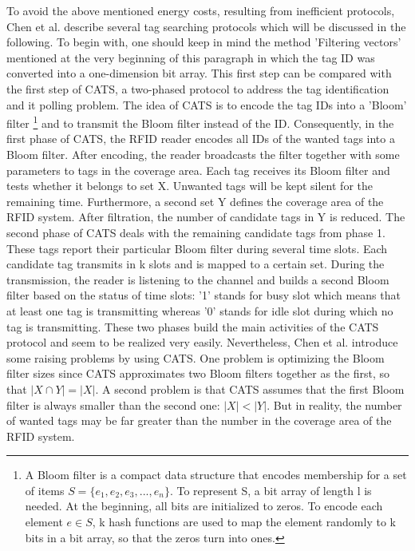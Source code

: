 To avoid the above mentioned energy costs, resulting from inefficient protocols, Chen et al. describe several tag searching protocols \cite[p.13 ff.]{chen} which will be discussed in the following. 
To begin with, one should keep in mind the method 'Filtering vectors' mentioned at the very beginning of this paragraph in which the tag ID was converted into a one-dimension bit array. This first step can be compared with the first step of \ac{CATS}, a two-phased protocol to address the tag identification and it polling problem. The idea of CATS is to encode the tag IDs into a 'Bloom' filter \footnote{A Bloom filter is a compact data structure that encodes membership for a set of items $S=\{ e_{1},e_{2},e_{3},...,e_{n}\}$. To represent S, a bit array of length l is needed. At the beginning, all bits are initialized to zeros. To encode each element $e \in S$, k hash functions are used to map the element randomly to k bits in a bit array, so that the zeros turn into ones.}  \cite[p.15]{chen} and to transmit the Bloom filter instead of the ID. 
Consequently, in the first phase of CATS, the RFID reader encodes all IDs of the wanted tags into a Bloom filter. After encoding, the reader broadcasts the filter together with some parameters to tags in the coverage area. Each tag receives its Bloom filter and tests whether it belongs to  set X. Unwanted tags will be kept silent for the remaining time. Furthermore, a second set Y defines the coverage area of the RFID system. After filtration, the number of candidate tags in Y is reduced.
The second phase of CATS deals with the remaining candidate tags from phase 1. These tags report their particular Bloom filter during several time slots. Each candidate tag transmits in k slots and is mapped to a certain set. During the transmission, the reader is listening to the channel and builds a second Bloom filter based on the status of time slots: '1' stands for busy slot which means that at least one tag is transmitting whereas '0' stands for idle slot during which no tag is transmitting. 
These two phases build the main activities of the CATS protocol and seem to be realized very easily. Nevertheless, Chen et al. introduce some raising problems by using CATS. One problem is optimizing the Bloom filter sizes since CATS approximates two Bloom filters together as the first, so that $|X \cap Y|=|X|$. A second problem is that CATS assumes that the first Bloom filter is always smaller than the second one: $|X|<|Y|$. But in reality, the number of wanted tags may be far greater than the number in the coverage area of the RFID system. 

